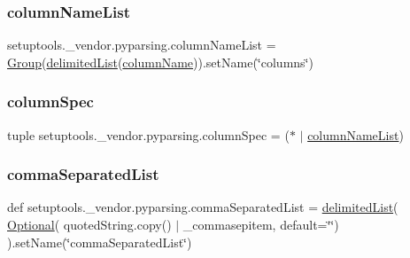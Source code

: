 \subsubsection{\texorpdfstring{column\+Name\+List}{columnNameList}}
{\footnotesize\ttfamily setuptools.\+\_\+vendor.\+pyparsing.\+column\+Name\+List = \hyperlink{classsetuptools_1_1__vendor_1_1pyparsing_1_1_group}{Group}(\hyperlink{namespacesetuptools_1_1__vendor_1_1pyparsing_a1989367af98a82b6d6b4860de6b9f2f1}{delimited\+List}(\hyperlink{namespacesetuptools_1_1__vendor_1_1pyparsing_a854cda2a40f683747cd518322d7925f6}{column\+Name})).set\+Name(\char`\"{}columns\char`\"{})}

\mbox{\label{namespacesetuptools_1_1__vendor_1_1pyparsing_a676b16b951c9f7b9ca91670f5c3f452b}} 
\subsubsection{\texorpdfstring{column\+Spec}{columnSpec}}
{\footnotesize\ttfamily tuple setuptools.\+\_\+vendor.\+pyparsing.\+column\+Spec = (\textquotesingle{}$\ast$\textquotesingle{} $\vert$ \hyperlink{namespacesetuptools_1_1__vendor_1_1pyparsing_a43b508916c3f6df80d98c98bc18b822d}{column\+Name\+List})}

\mbox{\label{namespacesetuptools_1_1__vendor_1_1pyparsing_a81decc4ce7b7bad938c5dd43adb6d24c}} 
\subsubsection{\texorpdfstring{comma\+Separated\+List}{commaSeparatedList}}
{\footnotesize\ttfamily def setuptools.\+\_\+vendor.\+pyparsing.\+comma\+Separated\+List = \hyperlink{namespacesetuptools_1_1__vendor_1_1pyparsing_a1989367af98a82b6d6b4860de6b9f2f1}{delimited\+List}( \hyperlink{classsetuptools_1_1__vendor_1_1pyparsing_1_1_optional}{Optional}( quoted\+String.\+copy() $\vert$ \+\_\+commasepitem, default=\char`\"{}\char`\"{}) ).set\+Name(\char`\"{}comma\+Separated\+List\char`\"{})}

